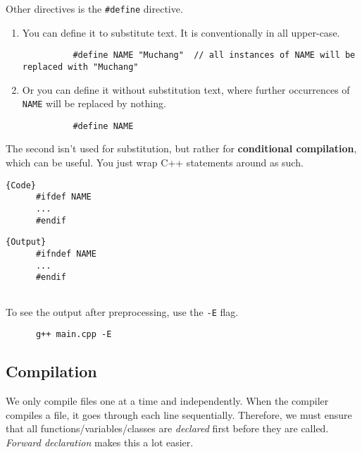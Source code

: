 \documentclass{article}
\begin{document}
    Other directives is the \texttt{\#define} directive. 
    \begin{enumerate}
      \item You can define it to substitute text. It is conventionally in all upper-case.  
        \begin{lstlisting}
          #define NAME "Muchang"  // all instances of NAME will be replaced with "Muchang"
        \end{lstlisting}
      \item Or you can define it without substitution text, where further occurrences of \texttt{NAME} will be replaced by nothing. 
        \begin{lstlisting}
          #define NAME 
        \end{lstlisting}
    \end{enumerate}

    The second isn't used for substitution, but rather for \textbf{conditional compilation}, which can be useful. You just wrap C++ statements around as such.

    \noindent\begin{minipage}{.5\textwidth}
    \begin{lstlisting}[]{Code}
      #ifdef NAME 
      ... 
      #endif
    \end{lstlisting}
    \end{minipage}
    \hfill
    \begin{minipage}{.49\textwidth}
    \begin{lstlisting}[]{Output}
      #ifndef NAME 
      ... 
      #endif
      
    \end{lstlisting}
    \end{minipage} 

    To see the output after preprocessing, use the \texttt{-E} flag. 
    \begin{lstlisting}
      g++ main.cpp -E
    \end{lstlisting}

  \subsection{Compilation} 

    We only compile files one at a time and independently. When the compiler compiles a file, it goes through each line sequentially. Therefore, we must ensure that all functions/variables/classes are \textit{declared} first before they are called. \textit{Forward declaration} makes this a lot easier. 
\end{document}
